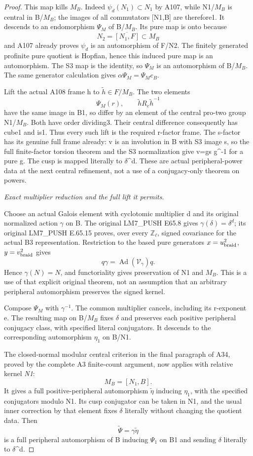 \begin{proof}
This map kills \(M_B\). Indeed \(\psi_d(N_1)\subset N_1\) by A107, while N1/\(M_B\) is central in B/\(M_B\); the images of all commutators [N1,B] are therefore1. It descends to an endomorphism \(\Psi_M\) of B/\(M_B\). Its pure map is onto because
\[
N_2=\overline{[N_1,F]}\subset M_B
\]
and A107 already proves \(\psi_d\) is an automorphism of F/N2. The finitely generated profinite pure quotient is Hopfian, hence this induced pure map is an automorphism. The S3 map is the identity, so \(\Psi_M\) is an automorphism of B/\(M_B\). The same generator calculation gives \(\alpha\Psi_M=\Psi_M c_B\).

Lift the actual A108 frame h to \(\widetilde h\in F/M_B\). The two elements
\[
\Psi_M(r),\qquad \widetilde hR_e\widetilde h^{-1}
\]
have the same image in B1, so differ by an element of the central pro-two group N1/\(M_B\). Both have order dividing3. Their central difference consequently has cube1 and is1. Thus every such lift is the required r-factor frame. The s-factor has its genuine full frame already: v is an involution in B with S3 image s, so the full finite-factor torsion theorem and the S3 normalization give v=gs g^-1 for a pure g. The cusp is mapped literally to \(\delta\)^d. These are actual peripheral-power data at the next central refinement, not a use of a conjugacy-only theorem on powers.

\medskip\noindent\emph{Exact multiplier reduction and the full lift it permits}.

Choose an actual Galois element with cyclotomic multiplier d and its original normalized action \(\gamma\) on B. The original LM7\_PUSH E65.8 gives \(\gamma(\delta)=\delta^d\); its original LM7\_PUSH E.65.15 proves, over every \(\mathbb Z_\ell\), signed covariance for the actual B3 representation. Restriction to the based pure generators \(x=u_{\rm braid}^2\), \(y=v_{\rm braid}^2\) gives
\[
q\gamma=\operatorname{Ad}(\mathcal V_\gamma)q.
\]
Hence \(\gamma(N)=N\), and functoriality gives preservation of N1 and \(M_B\). This is a use of that explicit original theorem, not an assumption that an arbitrary peripheral automorphism preserves the signed kernel.

Compose \(\Psi_M\) with \(\gamma^{-1}\). The common multiplier cancels, including its r-exponent e. The resulting map on B/\(M_B\) fixes \(\delta\) and preserves each positive peripheral conjugacy class, with specified literal conjugators. It descends to the corresponding automorphism \(\eta_1\) on B/N1.

The closed-normal modular central criterion in the final paragraph of A34, proved by the complete A3 finite-count argument, now applies with relative kernel \emph{N1}:
\[
M_B=[N_1,B].
\]
It gives a full positive-peripheral automorphism \(\widetilde\eta\) inducing \(\eta_1\), with the specified conjugators modulo N1. Its cusp conjugator can be taken in N1, and the usual inner correction by that element fixes \(\delta\) literally without changing the quotient data. Then
\[
\widetilde\Psi=\gamma\widetilde\eta
\]
is a full peripheral automorphism of B inducing \(\Psi_1\) on B1 and sending \(\delta\) literally to \(\delta\)^d.


\end{proof}
